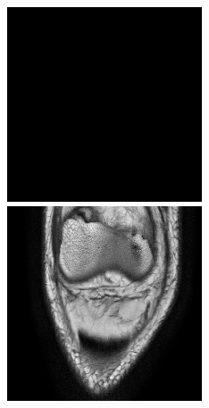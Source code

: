 \begin{figure}[H]
\endminipage\hfill
{}%
  \includegraphics[width=\linewidth]{imgs/c8.png}
\endminipage
\vspace{0.2cm}
  \includegraphics[width=\linewidth]{imgs/a7.png}

\end{figure}
